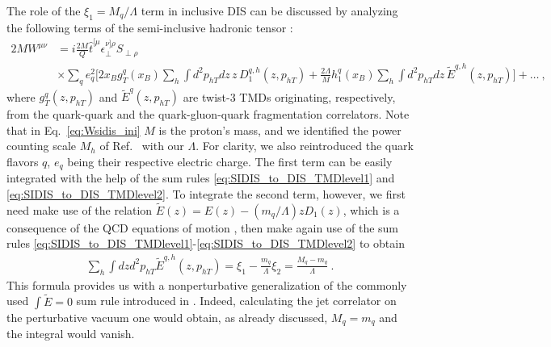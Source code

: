 \documentclass[preprintnumbers,floatfix,nofootinbib]{revtex4}
\newcommand{\xbj}{{x_B}}                   %
\newcommand{\mj}{M_q}
\newcommand{\mq}{m_q}
\begin{document}
The role of the $\xi_1=M_q/\Lambda$ term in inclusive DIS can be discussed by analyzing the following terms of the semi-inclusive hadronic tensor \cite{Mulders:1995dh}:
\begin{align}
  \label{eq:Wsidis_ini}
  2 M  W^{\mu\nu}
    & = i \frac{2M}{Q} \hat t^{[\mu}_{\phantom \perp} 
    \epsilon_\perp^{\nu]\rho}S_{\perp\rho} \\
    & \times \sum_q e_q^2
    \bigg[ 2 \xbj g_T^q(\xbj) \sum_h \int d^2p_{hT} dz \, z\, D_1^{q,h}(z,p_{hT}) 
  + \frac{2\Lambda}{M} h_1^q(\xbj) \sum_h \int d^2p_{hT}  dz \, \tilde E^{q,h}(z,p_{hT}) \bigg] + \ldots \ , \nonumber
\end{align}
where $g_T^q(z,p_{hT})$ and $\tilde E^q(z,p_{hT})$ are twist-3 TMDs originating, respectively, from the quark-quark and the quark-gluon-quark fragmentation correlators. Note that in Eq.~\eqref{eq:Wsidis_ini} $M$ is the proton's mass, and we identified the power counting scale $M_h$ of Ref.~\cite{Mulders:1995dh} with our $\Lambda$. For clarity, we also reintroduced the quark flavors $q$, $e_q$ being their respective electric charge. 
The first term can be easily integrated with the help of the sum rules
\eqref{eq:SIDIS_to_DIS_TMDlevel1} and \eqref{eq:SIDIS_to_DIS_TMDlevel2}. To integrate the second term, however, we first need make
use of the relation $\tilde E(z) = E(z) - (\mq/\Lambda) z D_1(z)$, which is a
consequence of the QCD equations of motion \cite{Bacchetta:2006tn}, then
make again use of the sum rules \eqref{eq:SIDIS_to_DIS_TMDlevel1}-\eqref{eq:SIDIS_to_DIS_TMDlevel2} to obtain
\begin{align}
  \sum_h \int dz d^2p_{hT} \tilde E^{q,h}(z,p_{hT}) 
    = \xi_1 - \frac{\mq}{\Lambda} \xi_2 = \frac{\mj - \mq}{\Lambda }\ .
\end{align}
This formula provides us with a
nonperturbative generalization of the commonly used $\int\tilde E =0$ sum
rule introduced in \cite{Jaffe:1996zw}. Indeed, calculating the jet correlator 
on the perturbative vacuum one would obtain, as already discussed, $\mj=\mq$
and the integral would vanish.
\end{document}

